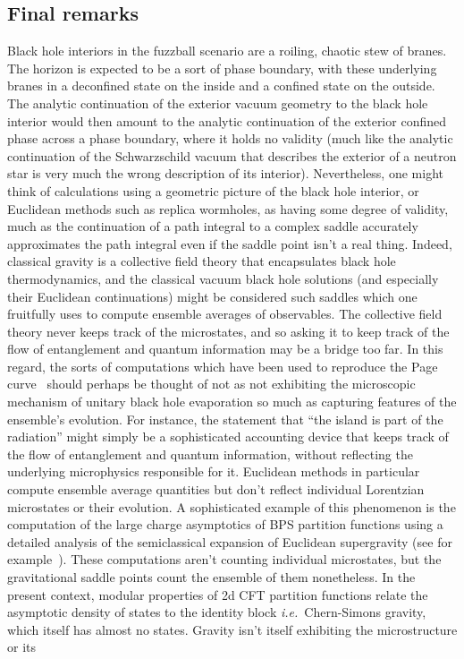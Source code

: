 \documentclass[11pt]{article}
\newcommand{\rcite}{\cite}
\def\ie{{i.e.}}
\numberwithin{equation}{section}
\def\ie{{\it i.e.}}
\def\ie{{\it i.e.}}
\begin{document}

\subsection{Final remarks}
\label{sec:lastword}



Black hole interiors in the fuzzball scenario are a roiling, chaotic stew of branes.  The horizon is expected to be a sort of phase boundary, with these underlying branes in a deconfined state on the inside and a confined state on the outside.  The analytic continuation of the exterior vacuum geometry to the black hole interior would then amount to the analytic continuation of the exterior confined phase across a phase boundary, where it holds no validity (much like the analytic continuation of the Schwarzschild vacuum that describes the exterior of a neutron star is very much the wrong description of its interior).  Nevertheless, one might think of calculations using a geometric picture of the black hole interior, or Euclidean methods such as replica wormholes, as having some degree of validity, much as the continuation of a path integral to a complex saddle accurately approximates the path integral even if the saddle point isn't a real thing.  Indeed, classical gravity is a collective field theory that encapsulates black hole thermodynamics, and the classical vacuum black hole solutions (and especially their Euclidean continuations) might be considered such saddles which one fruitfully uses to compute ensemble averages of observables.  The collective field theory never keeps track of the microstates, and so asking it to keep track of the flow of entanglement and quantum information may be a bridge too far.  In this regard, the sorts of computations which have been used to reproduce the Page curve~\rcite{Penington:2019npb,Almheiri:2019qdq,Penington:2019kki,Chakravarty:2020wdm} should perhaps be thought of not as not exhibiting the microscopic mechanism of unitary black hole evaporation so much as capturing features of the ensemble's evolution.  For instance, the statement that ``the island is part of the radiation'' might simply be a sophisticated accounting device that keeps track of the flow of entanglement and quantum information, without reflecting the underlying microphysics responsible for it.  Euclidean methods in particular compute ensemble average quantities but don't reflect individual Lorentzian microstates or their evolution.  A sophisticated example of this phenomenon is the computation of the large charge asymptotics of BPS partition functions using a detailed analysis of the semiclassical expansion of Euclidean supergravity (see for example~\rcite{Dabholkar:2012zz,Cabo-Bizet:2018ehj,Iliesiu:2022kny}).  These computations aren't counting individual microstates, but the gravitational saddle points count the ensemble of them nonetheless.  In the present context, modular properties of 2d CFT partition functions relate the asymptotic density of states to the identity block \ie\ Chern-Simons gravity, which itself has almost no states.  Gravity isn't itself exhibiting the microstructure or its 
\end{document}
